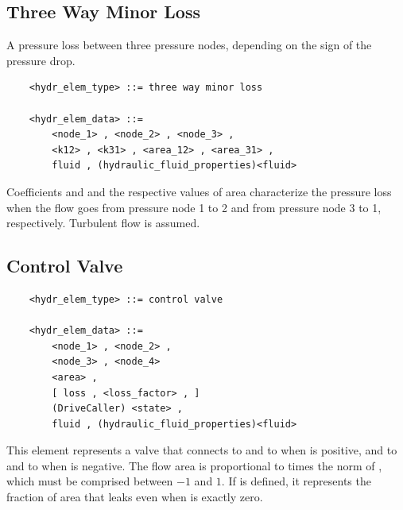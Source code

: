 \subsection{Three Way Minor Loss}
A pressure loss between three pressure nodes,
depending on the sign of the pressure drop.
\label{sec:EL:HYDR:THREE_WAY_MINOR_LOSS}
\begin{verbatim}
    <hydr_elem_type> ::= three way minor loss

    <hydr_elem_data> ::=
        <node_1> , <node_2> , <node_3> ,
        <k12> , <k31> , <area_12> , <area_31> ,
        fluid , (hydraulic_fluid_properties)<fluid>
\end{verbatim}
Coefficients  and  and the respective values of area
characterize the pressure loss when the flow goes
from pressure node 1 to 2 and from pressure node 3 to 1, respectively.
Turbulent flow is assumed.



\subsection{Control Valve}
\label{sec:EL:HYDR:CONTROL_VALVE}
\begin{verbatim}
    <hydr_elem_type> ::= control valve

    <hydr_elem_data> ::=
        <node_1> , <node_2> ,
        <node_3> , <node_4>
        <area> ,
        [ loss , <loss_factor> , ]
        (DriveCaller) <state> ,
        fluid , (hydraulic_fluid_properties)<fluid>
\end{verbatim}
This element represents a valve that connects
 to  and  to 
when  is positive, and  to 
and  to  when  is negative.
The flow area is proportional to  times the norm of ,
which must be comprised between $-1$ and $1$.
If  is defined, it represents the fraction
of area that leaks even when  is exactly zero.



